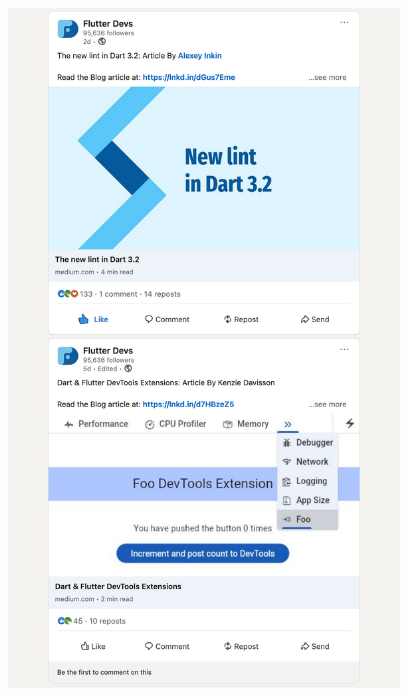 \Continuing
\begin{center}
    \includegraphics[width=28em]{flutter-devs-posts-p3}
\end{center}
\WillContinue
\pagebreak

